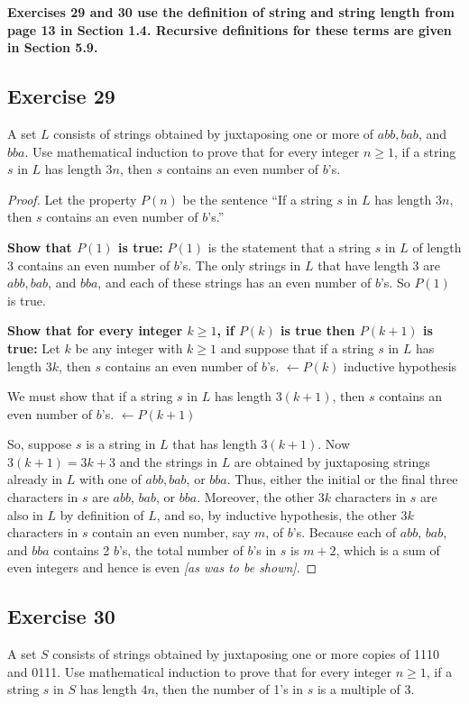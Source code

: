 \documentclass[14pt]{extarticle}
\newcommand{\from}{\leftarrow}
\newcommand{\cy}{\color{cyan}}
\begin{document}
{\bf \cy Exercises 29 and 30 use the definition of string and string length from page 13 in Section 1.4. Recursive definitions for these terms are given in Section 5.9.}

\subsection{Exercise 29}
A set $L$ consists of strings obtained by juxtaposing one or more of $abb, bab$, and $bba$. Use mathematical induction to prove that for every integer $n \geq 1$, if a string $s$ in $L$ has length $3n$, then $s$ contains an even number of $b$’s.

\begin{proof}
    Let the property $P(n)$ be the sentence “If a string $s$ in $L$ has length $3n$, then $s$ contains an even number of $b$’s.”

    {\bf Show that $P(1)$ is true:} $P(1)$ is the statement that a string $s$ in $L$ of length 3 contains an even number of $b$’s. The only strings in $L$ that have length 3 are $abb, bab$, and $bba$, and each of these strings has an even number of $b$’s. So $P(1)$ is true.

        {\bf Show that for every integer $k \geq 1$, if $P(k)$ is true then $P(k + 1)$ is true:} Let $k$ be any integer with $k \geq 1$ and suppose that if a string $s$ in $L$ has length $3k$, then $s$ contains an even number of $b$’s. {\cy $\from P(k)$ inductive hypothesis}

    We must show that if a string $s$ in $L$ has length $3(k + 1)$, then $s$ contains an even number of $b$’s. {\cy $\from P(k + 1)$}

    So, suppose $s$ is a string in $L$ that has length $3(k + 1)$. Now $3(k + 1) = 3k + 3$ and the strings in $L$ are obtained by juxtaposing strings already in $L$ with one of $abb, bab$, or $bba$. Thus, either the initial or the final three characters in $s$ are $abb$, $bab$, or $bba$. Moreover, the other $3k$ characters in $s$ are also in $L$ by definition of $L$, and so, by inductive hypothesis, the other $3k$ characters in $s$ contain an even number, say $m$, of $b$’s. Because each of $abb$, $bab$, and $bba$ contains 2 $b$’s, the total number of $b$’s in $s$ is $m + 2$, which is a sum of even integers and hence is even {\it [as was to be shown]}.
\end{proof}

\subsection{Exercise 30}
A set $S$ consists of strings obtained by juxtaposing one or more copies of 1110 and 0111. Use mathematical induction to prove that for every integer $n \geq 1$, if a string $s$ in $S$ has length $4n$, then the number of 1’s in $s$ is a multiple of 3.
\end{document}
